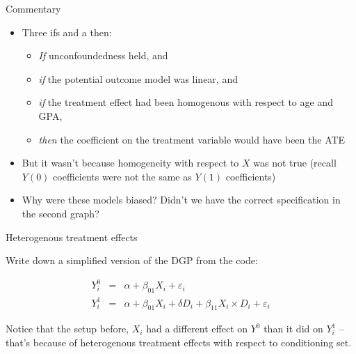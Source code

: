 \documentclass{beamer}
\begin{document}
\begin{frame}{Commentary}

\begin{itemize}

\item Three ifs and a then:

	\begin{itemize}
	\item \emph{If} unconfoundedness held, and 
	\item \emph{if} the potential outcome model was linear, and
	\item  \emph{if} the treatment effect had been homogenous with respect to age and GPA, 
	\item \emph{then} the coefficient on the treatment variable would have been the ATE 
	\end{itemize}
	
\item But it wasn't because homogeneity with respect to $X$ was not true (recall $Y(0)$ coefficients were not the same as $Y(1)$ coefficients)
\item Why were these models biased?  Didn't we have the correct specification in the second graph? 
\end{itemize}

\end{frame}

\begin{frame}{Heterogenous treatment effects}

Write down a simplified version of the DGP from the code:

\begin{eqnarray*}
Y^0_i &=& \alpha + \beta_{01} X_i + \varepsilon_i \\
Y^1_i &=& \alpha + \beta_{01} X_i + \delta D_i + \beta_{11} X_i \times D_i + \varepsilon_i
\end{eqnarray*}

\bigskip

Notice that the setup before, $X_i$ had a different effect on $Y^0$ than it did on $Y_i^1$ -- that's because of heterogenous treatment effects with respect to conditioning set. 

\end{frame}
\end{document}
